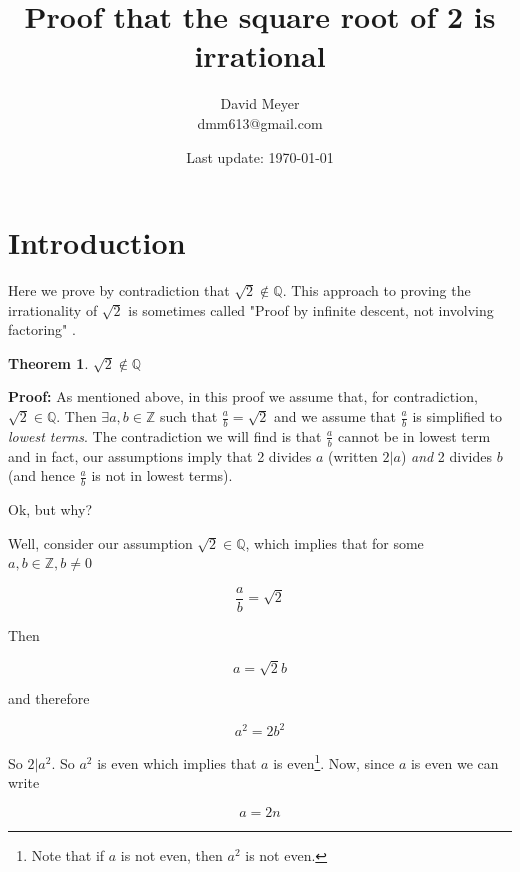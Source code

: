 \documentclass[11pt, oneside]{article}   	%
\title{Proof that the square root of 2 is irrational}
\author{David Meyer \\ dmm613@gmail.com}
\date{Last update: \today}							%
\theoremstyle{definition}
\newtheorem{thm}{Theorem}[section]
\begin{document}
\maketitle

\section{Introduction}
Here we prove by contradiction that $\sqrt{2} \notin
\mathbb{Q}$. This approach to proving the irrationality of
$\sqrt{2}$ is sometimes called "Proof by infinite descent, not
involving factoring" \cite{wiki:sqrt2}.

\begin{thm}
$\sqrt{2} \notin \mathbb{Q}$
\end{thm}

\noindent
\textbf{Proof:} As mentioned above, in this proof we assume that,
for contradiction, $\sqrt{2} \in \mathbb{Q}$. Then $\exists a,b
\in \mathbb{Z}$ such that $\frac{a}{b} = \sqrt{2}$ and we assume
that $\frac{a}{b}$ is simplified to \emph{lowest terms}. The
contradiction we will find is that $\frac{a}{b}$ cannot be in
lowest term and in fact, our assumptions imply that 2 divides $a$
(written $2|a$) \emph{and} 2 divides $b$ (and hence $\frac{a}{b}$
is not in lowest terms). 


\bigskip
\noindent
Ok, but why?


\bigskip
\noindent
Well, consider our assumption $\sqrt{2} \in \mathbb{Q}$, which
implies that for some $a,b \in \mathbb{Z}, b \neq 0$ 

\bigskip
\begin{equation*}
\frac{a}{b} = \sqrt{2}
\end{equation*}


\bigskip
\noindent
Then 

\begin{equation*}
a = \sqrt{2} b
\end{equation*}

\bigskip
\noindent
and therefore 

\begin{equation}
a^2 = 2b^2
\label{eqn:squared}
\end{equation}

\bigskip
\noindent
So $2|a^2$. So $a^2$ is even which implies that $a$ is
even\footnote{Note that if $a$ is not even, then $a^2$ is not
even.}. Now, since $a$ is even we can write

\begin{equation}
a = 2n
\label{eqn:a}
\end{equation}
\end{document}
